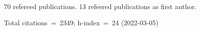 70 refereed publications. 13 refeered publications as first author.

Total citations~=~2349; h-index~=~24 (2022-03-05)